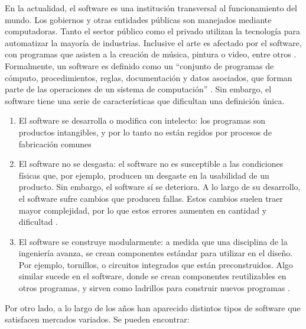 En la actualidad, el software es una institución transversal al funcionamiento del mundo. Los gobiernos y otras entidades públicas son manejados mediante computadoras. Tanto el sector público como el privado utilizan la tecnología para automatizar la mayoría de industrias. Inclusive el arte es afectado por el software, con programas que asisten a la creación de música, pintura o video, entre otros \cite{sommervilleIngenieriaSoftware9a2011}.
\bigbreak
Formalmente, un software es definido como un “conjunto de programas de cómputo, procedimientos, reglas, documentación y datos asociados, que forman parte de las operaciones de un sistema de computación” \cite{alarconaldanaMetodologiaParaDesarrollo2020}. Sin embargo, el software tiene una serie de características que dificultan una definición única.
\begin{enumerate}
    \item El software se desarrolla o modifica con intelecto: los programas son productos intangibles, y por lo tanto no están regidos por procesos de fabricación comunes \cite{sommervilleIngenieriaSoftware9a2011,pressmanIngenieriaSoftwareEnfoque2013}
    \item El software no se desgasta: el software no es susceptible a las condiciones físicas que, por ejemplo, producen un desgaste en la usabilidad de un producto. Sin embargo, el software sí se deteriora. A lo largo de su desarrollo, el software sufre cambios que producen fallas. Estos cambios suelen traer mayor complejidad, por lo que estos errores aumenten en cantidad y dificultad \cite{sommervilleIngenieriaSoftware9a2011,pressmanIngenieriaSoftwareEnfoque2013}.
    \item El software se construye modularmente: a medida que una disciplina de la ingeniería avanza, se crean componentes estándar para utilizar en el diseño. Por ejemplo, tornillos, o circuitos integrados que están preconstruidos. Algo similar sucede en el software, donde se crean componentes reutilizables en otros programas, y sirven como ladrillos para construir nuevos programas \cite{sommervilleIngenieriaSoftware9a2011,pressmanIngenieriaSoftwareEnfoque2013}.
\end{enumerate}
\bigbreak
Por otro lado, a lo largo de los años han aparecido distintos tipos de software que satisfacen mercados variados. Se pueden encontrar:
